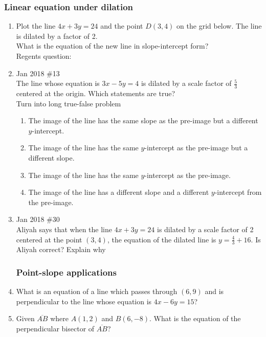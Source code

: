 \documentclass[12pt, twoside]{article}
\begin{document}
\subsubsection*{Linear equation under dilation}
  \begin{enumerate}


    \item Plot the line $4x+3y=24$ and the point $D(3,4)$ on the grid below.
    The line is dilated by a factor of 2.\\
    What is the equation of the new line in slope-intercept form?\\
    Regents question:
    \item Jan 2018 \#13\\
    The line whose equation is $3x -5y=4$ is dilated by a scale factor
    of $\frac{5}{3}$ centered at the origin. Which statements are true?\\
    Turn into long true-false problem
      \begin{enumerate}
        \item The image of the line has the same slope as the pre-image but a different $y$-intercept.
        \item The image of the line has the same $y$-intercept as the pre-image but a different slope.
        \item The image of the line has the same $y$-intercept as the pre-image.
        \item The image of the line has a different slope and a different $y$-intercept from the pre-image.
      \end{enumerate}

    \item Jan 2018 \#30\\
    Aliyah says that when the line $4x+3y=24$ is dilated by a scale factor of 2 centered at the point $(3,4)$, the equation of the dilated line is $y=\frac{4}{3}+16$. Is Aliyah correct? Explain why

\subsubsection*{Point-slope applications}
    \item What is an equation of a line which passes through $(6,9)$ and is perpendicular to the line whose equation is $4x-6y=15$?

    \item Given $\overline{AB}$ where $A(1,2)$ and $B(6,-8)$. What is the equation of the perpendicular bisector of $\overline{AB}$?


\end{enumerate}
\end{document}
